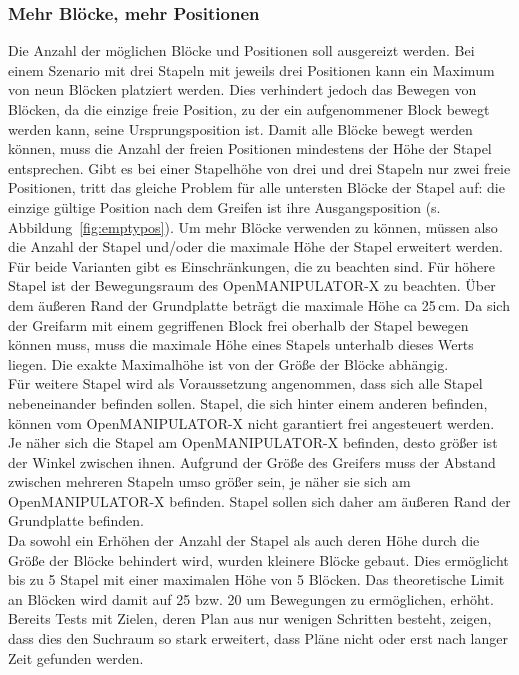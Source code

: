 \subsubsection{Mehr Blöcke, mehr Positionen}
Die Anzahl der möglichen Blöcke und Positionen soll ausgereizt werden.
Bei einem Szenario mit drei Stapeln mit jeweils drei Positionen kann ein Maximum von neun Blöcken platziert werden.
Dies verhindert jedoch das Bewegen von Blöcken, da die einzige freie Position, zu der ein aufgenommener Block bewegt werden kann, seine Ursprungsposition ist.
Damit alle Blöcke bewegt werden können, muss die Anzahl der freien Positionen mindestens der Höhe der Stapel entsprechen.
Gibt es bei einer Stapelhöhe von drei und drei Stapeln nur zwei freie Positionen, tritt das gleiche Problem für alle untersten Blöcke der Stapel auf: die einzige gültige Position nach dem Greifen ist ihre Ausgangsposition (s. Abbildung~\ref{fig:emptypos}).
Um mehr Blöcke verwenden zu können, müssen also die Anzahl der Stapel und/oder die maximale Höhe der Stapel erweitert werden.\\
Für beide Varianten gibt es Einschränkungen, die zu beachten sind.
Für höhere Stapel ist der Bewegungsraum des OpenMANIPULATOR-X zu beachten.
Über dem äußeren Rand der Grundplatte beträgt die maximale Höhe ca 25\,cm.
Da sich der Greifarm mit einem gegriffenen Block frei oberhalb der Stapel bewegen können muss, muss die maximale Höhe eines Stapels unterhalb dieses Werts liegen.
Die exakte Maximalhöhe ist von der Größe der Blöcke abhängig.\\
Für weitere Stapel wird als Voraussetzung angenommen, dass sich alle Stapel nebeneinander befinden sollen.
Stapel, die sich hinter einem anderen befinden, können vom OpenMANIPULATOR-X nicht garantiert frei angesteuert werden.
Je näher sich die Stapel am OpenMANIPULATOR-X befinden, desto größer ist der Winkel zwischen ihnen.
Aufgrund der Größe des Greifers muss der Abstand zwischen mehreren Stapeln umso größer sein, je näher sie sich am OpenMANIPULATOR-X befinden.
Stapel sollen sich daher am äußeren Rand der Grundplatte befinden.\\
Da sowohl ein Erhöhen der Anzahl der Stapel als auch deren Höhe durch die Größe der Blöcke behindert wird, wurden kleinere Blöcke gebaut.
Dies ermöglicht bis zu 5 Stapel mit einer maximalen Höhe von 5 Blöcken.
Das theoretische Limit an Blöcken wird damit auf 25 bzw. 20 um Bewegungen zu ermöglichen, erhöht.\\
Bereits Tests mit Zielen, deren Plan aus nur wenigen Schritten besteht, zeigen, dass dies den Suchraum so stark erweitert, dass Pläne nicht oder erst nach langer Zeit gefunden werden.
